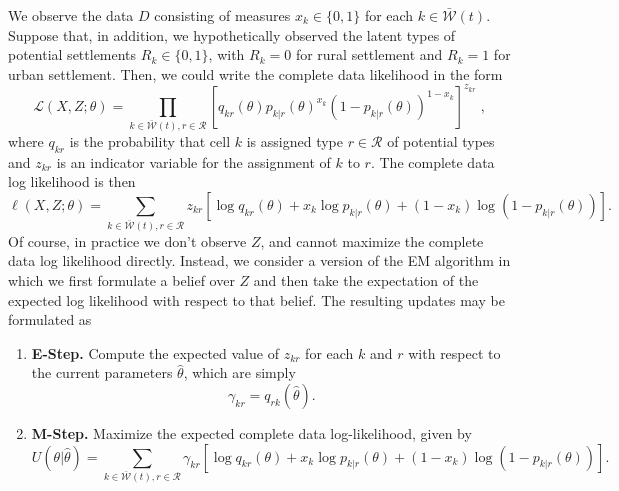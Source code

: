 \documentclass[english]{scrartcl}
\begin{document}
	We observe the data $D$ consisting of measures $x_k \in \{0,1\}$ for each $k \in \bar{\mathcal{W}}(t)$. 
	Suppose that, in addition, we hypothetically observed the latent types of potential settlements $R_k \in \{0,1\}$, with $R_k = 0$ for rural settlement and $R_k = 1$ for urban settlement. 
	Then, we could write the complete data likelihood in the form 
	\begin{equation}
		\mathcal{L}(X, Z;\theta) = \prod_{k \in \bar{\mathcal{W}}(t), r \in \mathcal{R}}\left[ q_{kr}(\theta)p_{k|r}(\theta)^{x_k}(1 - p_{k|r}(\theta))^{1 - x_k}\right]^{z_{kr}}\;, 
	\end{equation}
	where $q_{kr}$ is the probability that cell $k$ is assigned type $r \in \mathcal{R}$ of potential types and $z_{kr}$ is an indicator variable for the assignment of $k$ to $r$. 
	The complete data log likelihood is then 
	\begin{equation}
		\ell(X,Z;\theta) =  \sum_{k \in \bar{\mathcal{W}}(t), r \in \mathcal{R}} z_{kr}\left[\log q_{kr}(\theta) + x_k \log p_{k|r}(\theta) + (1-x_k) \log (1 - p_{k|r}(\theta))\right].
	\end{equation}
	Of course, in practice we don't observe $Z$, and cannot maximize the complete data log likelihood directly. 
	Instead, we consider a version of the EM algorithm in which we first formulate a belief over $Z$ and then take the expectation of the expected log likelihood with respect to that belief. 
	The resulting updates may be formulated as 
	\begin{enumerate}
		\item \textbf{E-Step.} Compute the expected value of $z_{kr}$ for each $k$ and $r$ with respect to the current parameters $\hat{\theta}$, which are simply 
		\begin{equation}
			\gamma_{kr} = q_{rk}(\hat{\theta}).
		\end{equation}
		\item \textbf{M-Step.} Maximize the expected complete data log-likelihood, given by 
		\begin{equation}
			U(\theta|\hat{\theta}) = \sum_{k \in \bar{\mathcal{W}}(t), r \in \mathcal{R}} \gamma_{kr}\left[\log q_{kr}(\theta) + x_k \log p_{k|r}(\theta) + (1-x_k) \log (1 - p_{k|r}(\theta))\right].
		\end{equation}
	\end{enumerate}
\end{document}
